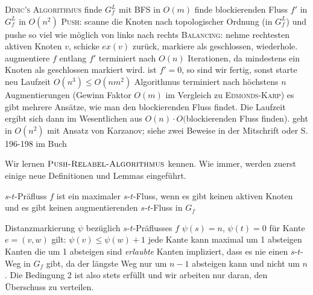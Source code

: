\begin{outline}

    \1 \textsc{Dinic's Algorithmus}
        \2 finde $G^L_f$ mit BFS in $O(m)$
        \2 finde blockierenden Fluss $f'$ in $G^L_f$ in $O(n^2)$
            \3 \textsc{Push:} scanne die Knoten nach topologischer Ordnung (in $G^L_f$) und pushe so viel wie möglich von links nach rechts
            \3 \textsc{Balancing:} nehme rechtesten aktiven Knoten $v$, schicke $ex(v)$ zurück, markiere als geschlossen, wiederhole.
            \3 augmentiere $f$ entlang $f'$
            \3 terminiert nach $O(n)$ Iterationen, da mindestens ein Knoten als geschlossen markiert wird.
        \2 ist $f'=0$, so sind wir fertig, sonst starte neu
        \2 Laufzeit $O(n^3)\leq O(nm^2)$
            \3 Algorithmus terminiert nach höchstens $n$ Augmentierungen (Gewinn Faktor $O(m)$ im Vergleich zu \textsc{Edmonds-Karp})
            \3 es gibt mehrere Ansätze, wie man den blockierenden Fluss findet. Die Laufzeit ergibt sich dann im Wesentlichen aus $O(n)\cdot O($blockierenden Fluss finden).
            \3 geht in $O(n^2)$ mit Ansatz von Karzanov; siehe zwei Beweise in der Mitschrift oder S. 196-198 im Buch
            

\0 Wir lernen $\textsc{Push-Relabel-Algorithmus}$ kennen. Wie immer, werden zuerst einige neue Definitionen und Lemmas eingeführt. 

\1 $s$-$t$-Präfluss $f$ ist ein maximaler $s$-$t$-Fluss, wenn
    \2 es gibt keinen aktiven Knoten und
    \2 es gibt keinen augmentierenden $s$-$t$-Fluss in $G_f$


\1 Distanzmarkierung $\psi$ bezüglich $s$-$t$-Präflusses $f$
    \2 $\psi(s)=n$, $\psi(t)=0$
    \2 für Kante $e=(v,w)$ gilt: $\psi(v) \leq \psi(w) + 1$
        \3 jede Kante kann maximal um 1 absteigen 
        \3 Kanten die um 1 absteigen sind \textit{erlaubte} Kanten
    \2 impliziert, dass es nie einen $s$-$t$-Weg in $G_f$ gibt, da der längste Weg nur um $n-1$ absteigen kann und nicht um $n$. Die Bedingung 2 ist also stets erfüllt und wir arbeiten nur daran, den Überschuss zu verteilen.


\end{outline}
